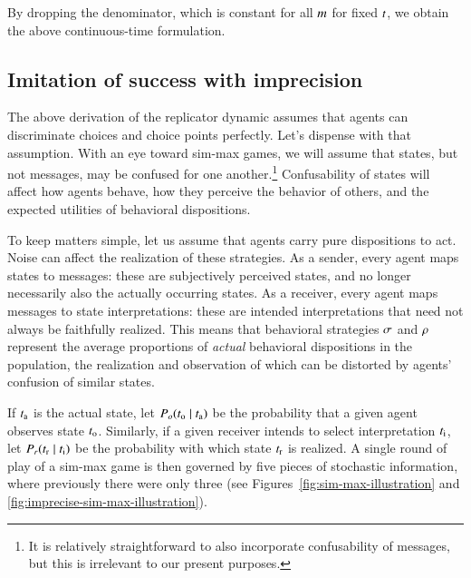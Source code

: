 \documentclass[fleqn,reqno,10pt]{article}
\begin{document}
By dropping the denominator, which is constant for all $m$ for fixed
$t$, we obtain the above continuous-time formulation.


\subsection{Imitation of success with imprecision}
\label{sec:imit-succ-with}

The above derivation of the replicator dynamic assumes that agents can discriminate choices and
choice points perfectly. Let's dispense with that assumption. With an eye toward sim-max games,
we will assume that states, but not messages, may be confused for one another.\footnote{It is
  relatively straightforward to also incorporate confusability of messages, but this is
  irrelevant to our present purposes.} Confusability of states will affect how agents behave,
how they perceive the behavior of others, and the expected utilities of behavioral
dispositions.

To keep matters simple, let us assume that agents carry pure dispositions to act. Noise can
affect the realization of these strategies. As a sender, every agent maps states to messages:
these are subjectively perceived states, and no longer necessarily also the actually occurring
states. As a receiver, every agent maps messages to state interpretations: these are intended
interpretations that need not always be faithfully realized. This means that behavioral
strategies $\sigma$ and $\rho$ represent the average proportions of \emph{actual}
behavioral dispositions in the population, the realization and observation of which can be
distorted by agents' confusion of similar states.

If $t_{\mathrm{a}}$ is the actual state, let $P_o(t_{\mathrm{o}} \mid t_{\mathrm{a}})$ be the
probability that a given agent observes state $t_{\mathrm{o}}$. Similarly, if a given receiver
intends to select interpretation $t_{\mathrm{i}}$, let $P_r(t_{\mathrm{r}} \mid t_{\mathrm{i}})$ be
the probability with which state $t_{\mathrm{r}}$ is realized. A single round of play of a sim-max
game is then governed by five pieces of stochastic information, where previously there were
only three (see Figures~\ref{fig:sim-max-illustration} and
\ref{fig:imprecise-sim-max-illustration}). 
\end{document}
